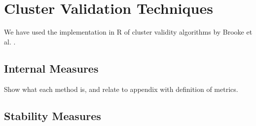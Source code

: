 \chapter{Cluster Validation Techniques}
\label{appendix_c}

We have used the implementation in R of cluster validity algorithms by
Brooke et al. \cite{brock2008}.
\section{Internal Measures}
Show what each method is, and relate to appendix with definition of metrics.


\section{Stability Measures}






